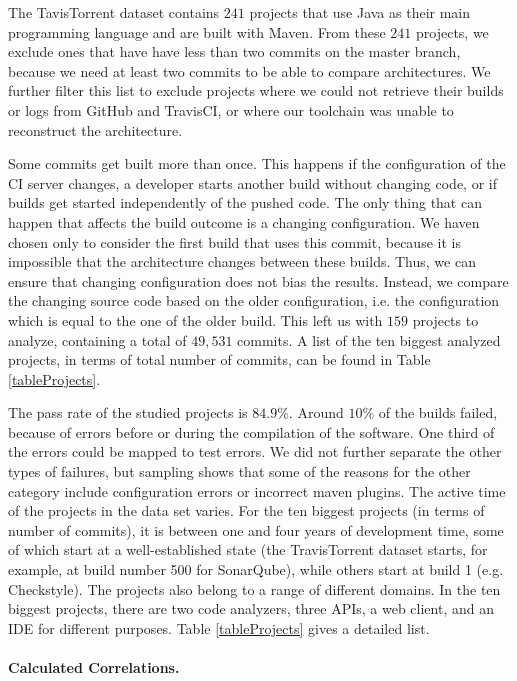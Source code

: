 \documentclass[sigconf, anonymous, review]{acmart}
\begin{document}
The TavisTorrent dataset contains $241$ projects that use Java as their main programming language and are built with Maven. 
From these $241$ projects, we exclude ones that have have less than two commits on the master branch, because we need at least two commits to be able to compare architectures. 
We further filter this list to exclude projects where we could not retrieve their builds or logs from GitHub and TravisCI, or where our toolchain was unable to reconstruct the architecture.

Some commits get built more than once. This happens if the configuration of the CI server changes, a developer starts another build without changing code, or if builds get started independently of the pushed code.
The only thing that can happen that affects the build outcome is a changing configuration. We haven chosen only to consider the first build that uses this commit, because it is impossible that the architecture changes between these builds.
Thus, we can ensure that changing configuration does not bias the results. Instead, we compare the changing source code based on the older configuration, i.e. the configuration which is equal to the one of the older build. 
This left us with $159$ projects to analyze, containing a total of
$49,531$ commits. A list of the ten biggest analyzed projects, in terms of total number of commits, can be found in Table \ref{tableProjects}.

The pass rate of the studied projects is $84.9\%$. Around $10\%$ of the builds failed, because of errors before or during the compilation of the software. One third of the errors could be mapped to test errors. We did not further separate the other types of failures, but sampling shows that some of the reasons for the other category include configuration errors or incorrect maven plugins.
The active time of the projects in the data set varies.
For the ten biggest projects (in terms of number of commits), it is between one and four years of development time, some of which start at a well-established state (the TravisTorrent dataset starts, for example, at build number 500 for SonarQube), while others start at build 1 (e.g. Checkstyle).
The projects also belong to a range of different domains.
In the ten biggest projects, there are two code analyzers, three APIs, a web client, and an IDE for different purposes. Table \ref{tableProjects} gives a detailed list.


\paragraph{Calculated Correlations.}
\end{document}
